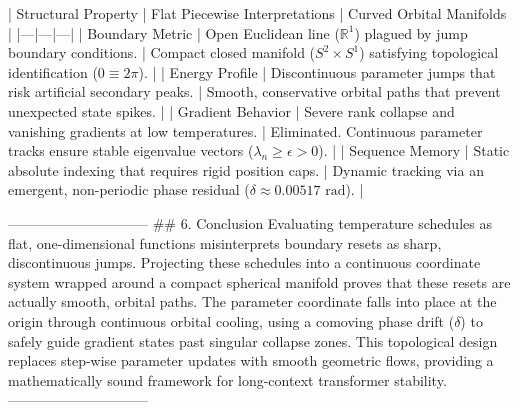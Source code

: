 | Structural Property | Flat Piecewise Interpretations | Curved Orbital Manifolds |
|---|---|---|
| Boundary Metric | Open Euclidean line ($\mathbb{R}^1$) plagued by jump boundary conditions. | Compact closed manifold ($S^2 \times S^1$) satisfying topological identification ($0 \equiv 2\pi$). |
| Energy Profile | Discontinuous parameter jumps that risk artificial secondary peaks. | Smooth, conservative orbital paths that prevent unexpected state spikes. |
| Gradient Behavior | Severe rank collapse and vanishing gradients at low temperatures. | Eliminated. Continuous parameter tracks ensure stable eigenvalue vectors ($\lambda_n \geq \epsilon > 0$). |
| Sequence Memory | Static absolute indexing that requires rigid position caps. | Dynamic tracking via an emergent, non-periodic phase residual ($\delta \approx 0.00517\text{ rad}$). |

------------------------------
## 6. Conclusion
Evaluating temperature schedules as flat, one-dimensional functions misinterprets boundary resets as sharp, discontinuous jumps. Projecting these schedules into a continuous coordinate system wrapped around a compact spherical manifold proves that these resets are actually smooth, orbital paths. The parameter coordinate falls into place at the origin through continuous orbital cooling, using a comoving phase drift ($\delta$) to safely guide gradient states past singular collapse zones. This topological design replaces step-wise parameter updates with smooth geometric flows, providing a mathematically sound framework for long-context transformer stability.
------------------------------
